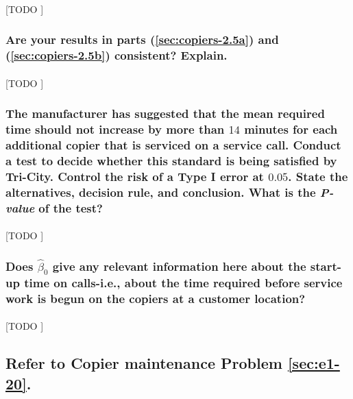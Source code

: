 \documentclass{article}
\begin{document}
        \paragraph{}
        [TODO ]

      \subsubsection{Are your results in parts (\ref{sec:copiers-2.5a}) and (\ref{sec:copiers-2.5b}) consistent? Explain.}

        \paragraph{}
        [TODO ]

      \subsubsection{The manufacturer has suggested that the mean required time should not increase by more
than $14$ minutes for each additional copier that is serviced on a service call. Conduct a test to decide whether this standard is being satisfied by Tri-City. Control the risk of a Type I error at $0.05$. State the alternatives, decision rule, and conclusion. What is the \emph{P-value} of the test?}

        \paragraph{}
        [TODO ]

      \subsubsection{Does $\widehat{\beta}_0$ give any relevant information here about the start-up time on calls-i.e., about the time required before service work is begun on the copiers at a customer location?}

        \paragraph{}
        [TODO ]

    \setcounter{subsection}{13}
    \subsection{Refer to \textbf{Copier maintenance} Problem \ref{sec:e1-20}.}
\end{document}
